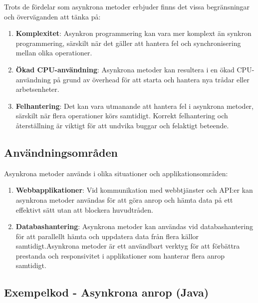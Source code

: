 Trots de fördelar som asynkrona metoder erbjuder finns det vissa
begränsningar och överväganden att tänka på:

\begin{enumerate}
\def\labelenumi{\arabic{enumi}.}
\tightlist
\item
  \textbf{Komplexitet}: Asynkron programmering kan vara mer komplext än
  synkron programmering, särskilt när det gäller att hantera fel och
  synchronisering mellan olika operationer.
\item
  \textbf{Ökad CPU-användning}: Asynkrona metoder kan resultera i en
  ökad CPU-användning på grund av överhead för att starta och hantera
  nya trådar eller arbetsenheter.
\item
  \textbf{Felhantering}: Det kan vara utmanande att hantera fel i
  asynkrona metoder, särskilt när flera operationer körs samtidigt.
  Korrekt felhantering och återställning är viktigt för att undvika
  buggar och felaktigt beteende.
\end{enumerate}

\hypertarget{anvuxe4ndningsomruxe5den}{%
\subsection{Användningsområden}\label{anvuxe4ndningsomruxe5den}}

Asynkrona metoder används i olika situationer och applikationsområden:

\begin{enumerate}
\def\labelenumi{\arabic{enumi}.}
\tightlist
\item
  \textbf{Webbapplikationer}: Vid kommunikation med webbtjänster och
  API:er kan asynkrona metoder användas för att göra anrop och hämta
  data på ett effektivt sätt utan att blockera huvudtråden.
\item
  \textbf{Databashantering}: Asynkrona metoder kan användas vid
  databashantering för att parallellt hämta och uppdatera data från
  flera källor samtidigt.Asynkrona metoder är ett användbart verktyg för
  att förbättra prestanda och responsivitet i applikationer som hanterar
  flera anrop samtidigt.
\end{enumerate}

\hypertarget{exempelkod---asynkrona-anrop-java}{%
\subsection{Exempelkod - Asynkrona anrop
(Java)}\label{exempelkod---asynkrona-anrop-java}}

